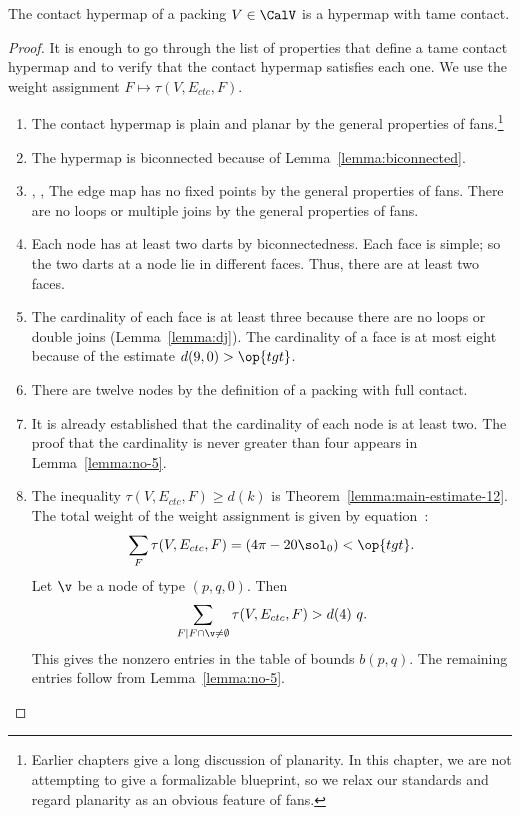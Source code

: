 
\begin{theorem} The contact hypermap of a 
  packing $V\in \CalV$ is a hypermap with tame contact.
\end{theorem}
%
%
%
%

\begin{proof} It is enough to go through the list of properties that
  define a tame contact hypermap and to verify that the contact
  hypermap satisfies each one.  We use the weight assignment $F\mapsto
  \tau(V,E_{ctc},F)$.

\begin{enumerate}
\item {} The contact hypermap is plain and planar by the
  general properties of fans.\footnote{Earlier chapters give a long
    discussion of planarity.  In this chapter, we are not attempting
    to give a formalizable blueprint, so we relax our standards and
    regard planarity as an obvious feature of fans.}
\item {} The hypermap is biconnected because of
  Lemma~\ref{lemma:biconnected}.
\item {}, ,  The
  edge map has no fixed points by the general properties of fans.
  There are no loops or multiple joins by the general properties of
  fans.
\item {} Each node has at least two darts by
  biconnectedness. Each face is simple; so the two darts at a node lie
  in different faces.  Thus, there are at least two faces.
\item {} The cardinality of each face is at least three
  because there are no loops or double joins (Lemma~\ref{lemma:dj}).
  The cardinality of a face is at most eight because of the estimate
  $d(9,0)>\op{tgt}$.
\item {} There are twelve nodes by the definition of a
  packing with full contact.
\item {} It is already established that the cardinality
  of each node is at least two.  The proof that the cardinality is
  never  greater than four appears in Lemma~\ref{lemma:no-5}.
\item {} The inequality $\tau(V,E_{ctc},F)\ge d(k)$ is
  Theorem~\ref{lemma:main-estimate-12}.
  The total weight of the weight assignment is given by
  equation~:
\[
  \sum_F \tau(V,E_{ctc},F) = (4\pi - 20\sol_0) < \op{tgt}.
\]
%
Let $\v$ be a node of type $(p,q,0)$.  
Then
\[
\sum_{F\mid F\cap \v\ne\emptyset}\tau(V,E_{ctc},F) > d(4)~q.
\]
This gives the nonzero entries in the table of bounds $b(p,q)$.  The
remaining entries follow from Lemma~\ref{lemma:no-5}.
\end{enumerate}
\end{proof}

